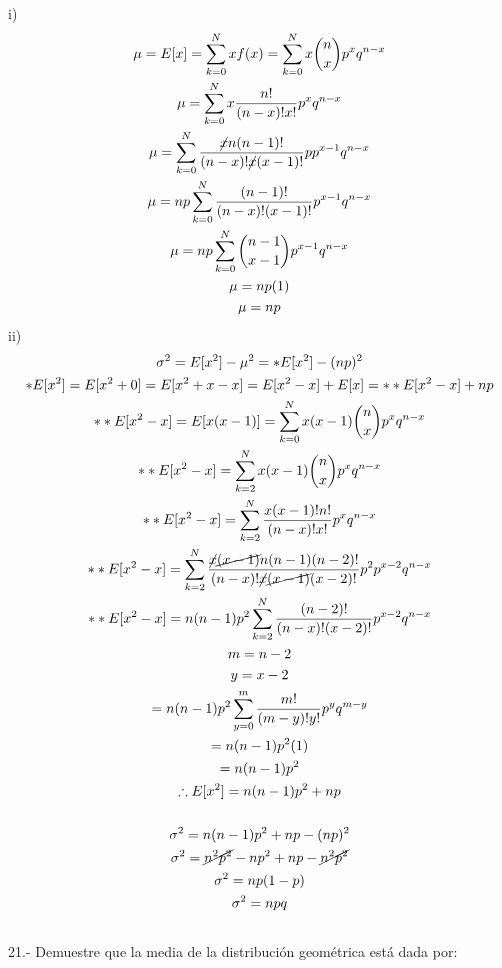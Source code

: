 \documentclass{article}
\begin{document}
i)
\begin{gather*}
	\mu = E[x] = \displaystyle\sum_{k=0}^N xf(x) = \displaystyle\sum_{k=0}^N x{n \choose x}p^xq^{n-x}\\
	\mu =  \displaystyle\sum_{k=0}^N x\frac{n!}{(n-x)!x!}p^xq^{n-x}\\
	\mu = \displaystyle\sum_{k=0}^N \frac{\cancel{x}n(n-1)!}{(n-x)!\cancel{x}(x-1)!}pp^{x-1}q^{n-x}\\
	\mu = np\displaystyle\sum_{k=0}^N \frac{(n-1)!}{(n-x)!(x-1)!}p^{x-1}q^{n-x}\\
	\mu = np\displaystyle\sum_{k=0}^N {n-1 \choose x - 1}p^{x-1}q^{n-x}\\
	\mu = np(1)\\
	\mu = np
\end{gather*}
ii)\
\begin{gather*}
	\sigma^2 = E[x^2] - \mu^2 = *E[x^2] - (np)^2\\
	*E[x^2] = E[x^2 + 0] = E[x^2 +x -x] = E[x^2 - x]+ E[x] = **E[x^2 - x]+ np\\
	**E[x^2 - x] = E[x(x-1)] = \displaystyle\sum_{k=0}^N x(x-1){n \choose x}p^xq^{n-x}\\
	**E[x^2 - x] = \displaystyle\sum_{k=2}^N x(x-1){n \choose x}p^xq^{n-x}\\
	**E[x^2 - x] = \displaystyle\sum_{k=2}^N\frac{x(x-1)!n!}{(n-x)!x!}p^xq^{n-x}\\
	**E[x^2 - x] = \displaystyle\sum_{k=2}^N\frac{\cancel{x}\cancel{(x-1)}n(n-1)(n-2)!}{(n-x)!\cancel{x}\cancel{(x-1)}(x-2)!}p^2p^{x-2}q^{n-x}\\
	**E[x^2 - x] = n(n-1)p^2 \displaystyle\sum_{k=2}^N \frac{(n-2)!}{(n-x)!(x-2)!}p^{x-2}q^{n-x}\\
	m = n -2\\
	y = x-2\\
	= n(n-1)p^2\displaystyle\sum_{y=0}^m \frac{m!}{(m-y)!y!}p^yq^{m-y}\\
	= n(n-1)p^2(1)\\
	= n(n-1)p^2\\
	\therefore E[x^2] = n(n-1)p^2 + np\\\\
	\sigma^2 = n(n-1)p^2 +np -(np)^2\\
	\sigma^2 = \cancel{n^2p^2} - np^2 +np - \cancel{n^2p^2}\\
	\sigma^2 = np(1-p)\\
	\sigma^2 = npq
\end{gather*}\\
21.- Demuestre que la media de la distribución geométrica está dada por:
\end{document}
